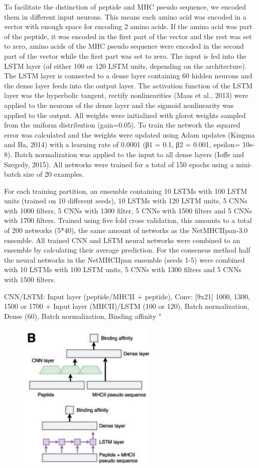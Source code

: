 \documentclass[]{scrartcl}
\begin{document}
To facilitate the distinction of peptide and MHC pseudo sequence, we encoded them in different input neurons. This means each amino acid was encoded in a vector with enough space for encoding 2 amino acids. If the amino acid was part of the peptide, it was encoded in the first part of the vector and the rest was set to zero, amino acids of the MHC pseudo sequence were encoded in the second part of the vector while the first part was set to zero. The input is fed into the LSTM layer (of either 100 or 120 LSTM units, depending on the architecture). The LSTM layer is connected to a dense layer containing 60 hidden neurons and the dense layer feeds into the output layer. The activation function of the LSTM layer was the hyperbolic tangent, rectify nonlinearities (Maas et al., 2013) were applied to the neurons of the dense layer and the sigmoid nonlinearity was applied to the output. All weights were initialized with glorot weights sampled from the uniform distribution (gain=0.05). To train the network the squared error was calculated and the weights were updated using Adam updates (Kingma and Ba, 2014) with a learning rate of 0.0001 (β1 = 0.1, β2 = 0.001, epsilon= 10e-8). Batch normalization was applied to the input to all dense layers (Ioffe and Szegedy, 2015). All networks were trained for a total of 150 epochs using a mini-batch size of 20 examples.

For each training partition, an ensemble containing 10 LSTMs with 100 LSTM units (trained on 10 different seeds), 10 LSTMs with 120 LSTM units, 5 CNNs with 1000 filters, 5 CNNs with 1300 filter, 5 CNNs with 1500 filters and 5 CNNs with 1700 filters. Trained using five fold cross validation, this amounts to a total of 200 networks (5*40), the same amount of networks as the NetMHCIIpan-3.0 ensemble. All trained CNN and LSTM neural networks were combined to an ensemble by calculating their average prediction. For the consensus method half the neural networks in the NetMHCIIpan ensemble (seeds 1-5) were combined with 10 LSTMs with 100 LSTM units, 5 CNNs with 1300 filters and 5 CNNs with 1500 filters.

CNN/LSTM:
Input layer (peptide/MHCII + peptide),
Conv: [9x21] 1000, 1300, 1500 or 1700 + Input layer (MHCII)/LSTM (100 or 120),
Batch normalization,
Dense (60),
Batch normalization,
Binding affinity
" \cite{Jurtz2017}
\begin{figure}[h]
	\centering
	\includegraphics[width=0.4\linewidth]{mhcii}
\end{figure}
\end{document}
